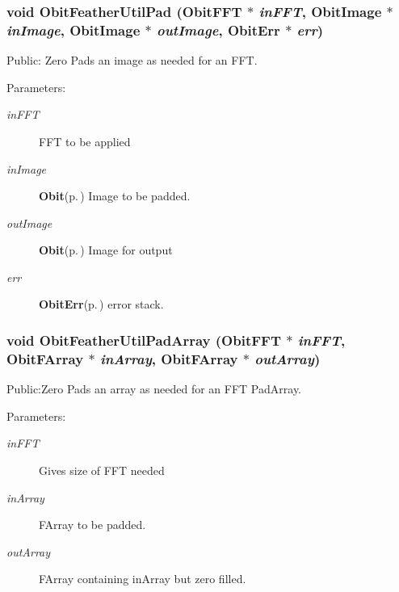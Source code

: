\subsubsection{\setlength{\rightskip}{0pt plus 5cm}void Obit\-Feather\-Util\-Pad ({\bf Obit\-FFT} $\ast$ {\em in\-FFT}, {\bf Obit\-Image} $\ast$ {\em in\-Image}, {\bf Obit\-Image} $\ast$ {\em out\-Image}, {\bf Obit\-Err} $\ast$ {\em err})}\label{ObitFeatherUtil_8h_a3}


Public: Zero Pads an image as needed for an FFT. 

\begin{Desc}
\item[Parameters:]
\begin{description}
\item[{\em in\-FFT}]FFT to be applied \item[{\em in\-Image}]{\bf Obit}{\rm (p.\,\pageref{structObit})} Image to be padded. \item[{\em out\-Image}]{\bf Obit}{\rm (p.\,\pageref{structObit})} Image for output \item[{\em err}]{\bf Obit\-Err}{\rm (p.\,\pageref{structObitErr})} error stack. \end{description}
\end{Desc}
\subsubsection{\setlength{\rightskip}{0pt plus 5cm}void Obit\-Feather\-Util\-Pad\-Array ({\bf Obit\-FFT} $\ast$ {\em in\-FFT}, {\bf Obit\-FArray} $\ast$ {\em in\-Array}, {\bf Obit\-FArray} $\ast$ {\em out\-Array})}\label{ObitFeatherUtil_8h_a5}


Public:Zero Pads an array as needed for an FFT Pad\-Array. 

\begin{Desc}
\item[Parameters:]
\begin{description}
\item[{\em in\-FFT}]Gives size of FFT needed \item[{\em in\-Array}]FArray to be padded. \item[{\em out\-Array}]FArray containing in\-Array but zero filled. \end{description}
\end{Desc}
